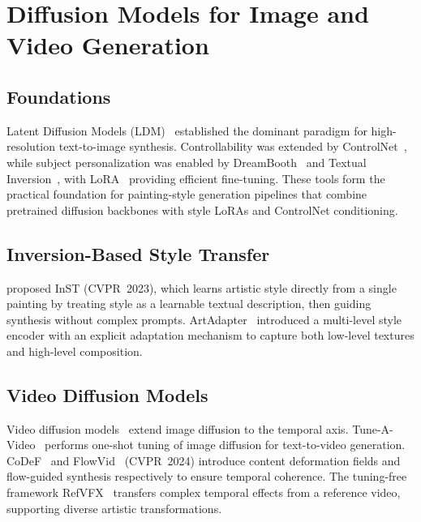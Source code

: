 \section{Diffusion Models for Image and Video Generation}
\label{sec:diffusion}

\subsection{Foundations}

Latent Diffusion Models (LDM)~\cite{rombach2022ldm} established the dominant paradigm
for high-resolution text-to-image synthesis. Controllability was extended by
ControlNet~\cite{zhang2023controlnet}, while subject personalization was enabled by
DreamBooth~\cite{ruiz2023dreambooth} and Textual Inversion~\cite{gal2023textualinversion},
with LoRA~\cite{hu2022lora} providing efficient fine-tuning. These tools form the
practical foundation for painting-style generation pipelines that combine pretrained
diffusion backbones with style LoRAs and ControlNet conditioning.

\subsection{Inversion-Based Style Transfer}

\citet{zhang2023inversion} proposed InST (CVPR~2023), which learns artistic style directly
from a single painting by treating style as a learnable textual description, then guiding
synthesis without complex prompts. ArtAdapter~\cite{chen2024artadapter} introduced a
multi-level style encoder with an explicit adaptation mechanism to capture both low-level
textures and high-level composition.

\subsection{Video Diffusion Models}

Video diffusion models~\cite{ho2022video,blattmann2023svd} extend image diffusion to the
temporal axis. Tune-A-Video~\cite{wu2023tuneavideo} performs one-shot tuning of image
diffusion for text-to-video generation. CoDeF~\cite{ouyang2024codef} and
FlowVid~\cite{liang2024flowvid} (CVPR~2024) introduce content deformation fields and
flow-guided synthesis respectively to ensure temporal coherence. The tuning-free
framework RefVFX~\cite{jones2026refvfx} transfers complex temporal effects from a
reference video, supporting diverse artistic transformations.

